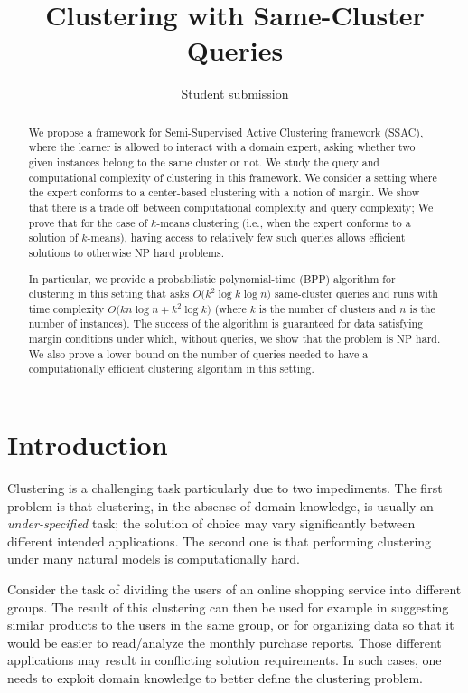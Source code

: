 \documentclass{article}
\title{Clustering with Same-Cluster Queries}
\author{Student submission}
\begin{document}
\maketitle

\begin{abstract}
We propose a framework for Semi-Supervised Active Clustering framework (SSAC), where the learner is allowed to interact with a domain expert, asking whether two given instances belong to the same cluster or not. We study the query and computational complexity of clustering in this framework. We consider a setting where the expert conforms to a center-based clustering with a notion of margin.  We show that there is a trade off between computational complexity and query complexity; We prove that for the case of $k$-means clustering (i.e., when the expert conforms to a solution of $k$-means), having access to relatively few such queries allows efficient solutions to otherwise NP hard problems.

In particular, we provide a probabilistic polynomial-time (BPP) algorithm  for clustering in this setting that asks $O\big(k^2\log k\log n)$ same-cluster queries and runs with time complexity $O\big(kn\log n + k^2\log k)$ (where $k$ is the number of clusters and $n$ is the number of instances). The success of the algorithm is guaranteed for data satisfying margin conditions under which, without queries, we show that the problem is NP hard. We also prove a lower bound on the number of queries needed to have a computationally efficient clustering algorithm in this setting.
\end{abstract}

\section{Introduction}

Clustering is a challenging task particularly due to two impediments. The first problem is that clustering, in the absense of domain knowledge, is usually an \emph{under-specified} task; the solution of choice may vary significantly between different intended applications. The second one is that performing clustering under many natural models is computationally hard.

Consider the task of dividing the users of an online shopping service into different groups. The result of this clustering can then be used for example in suggesting similar products to the users in the same group, or for organizing data so that it would be easier to read/analyze the monthly purchase reports. Those different applications may result in conflicting solution requirements. In such cases, one needs to exploit domain knowledge to better define the clustering problem.
\end{document}
